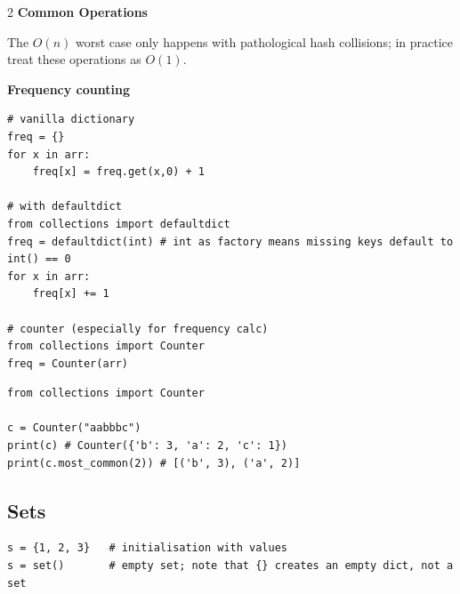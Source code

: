 \documentclass[9pt,a4paper]{extarticle}
\begin{document}
\begin{multicols}{2}
\noindent\textbf{Common Operations}\par\nopagebreak\vspace{1pt}

\usebox{\tblbox}\smallskip

The $O(n)$ worst case only happens with pathological hash collisions; in practice treat these operations as $O(1)$.


\noindent\textbf{Frequency counting}\par\nopagebreak\vspace{1pt}

\begin{lstlisting}
# vanilla dictionary
freq = {}
for x in arr:
    freq[x] = freq.get(x,0) + 1

# with defaultdict
from collections import defaultdict
freq = defaultdict(int) # int as factory means missing keys default to int() == 0
for x in arr:
    freq[x] += 1

# counter (especially for frequency calc)
from collections import Counter
freq = Counter(arr)
\end{lstlisting}

\begin{lstlisting}
from collections import Counter

c = Counter("aabbbc")
print(c) # Counter({'b': 3, 'a': 2, 'c': 1})
print(c.most_common(2)) # [('b', 3), ('a', 2)]
\end{lstlisting}

\subsection{Sets}

\begin{lstlisting}
s = {1, 2, 3}   # initialisation with values
s = set()       # empty set; note that {} creates an empty dict, not a set
\end{lstlisting}


\end{multicols}
\end{document}
